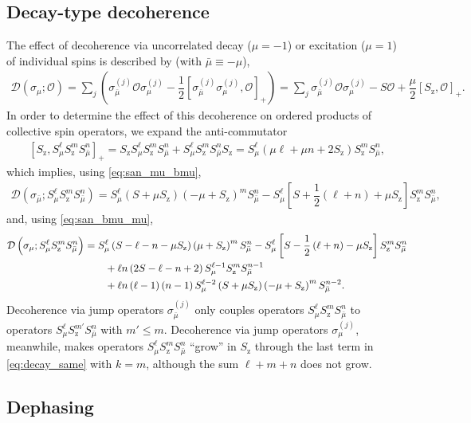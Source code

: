 \documentclass[aps,notitlepage,nofootinbib,11pt]{revtex4-1}
\newcommand{\f}[2]{\dfrac{#1}{#2}} %
\newcommand{\p}[1]{\left(#1\right)} %
\renewcommand{\sp}[1]{\left[#1\right]} %
\newcommand{\D}{\mathcal{D}}
\renewcommand{\O}{\mathcal{O}}
\newcommand{\z}{\text{z}}
\newcommand{\bmu}{{\bar\mu}}
\newcommand{\1}{\mathds{1}}
\begin{document}
\subsection{Decay-type decoherence}
\label{sec:decay_single}

The effect of decoherence via uncorrelated decay ($\mu=-1$) or
excitation ($\mu=1$) of individual spins is described by (with
$\bmu\equiv-\mu$),
\begin{align}
  \D\p{\sigma_\mu; \O}
  = \sum_j\p{\sigma_\bmu^{(j)} \O \sigma_\mu^{(j)}
    - \f12\sp{\sigma_\bmu^{(j)} \sigma_\mu^{(j)},\O}_+}
  = \sum_j \sigma_\bmu^{(j)} \O \sigma_\mu^{(j)}
    - S \O + \f{\mu}{2} \sp{S_\z, \O}_+.
\end{align}
In order to determine the effect of this decoherence on ordered
products of collective spin operators, we expand the anti-commutator
\begin{align}
  \sp{S_\z, S_\mu^\ell S_\z^m S_\bmu^n}_+
  = S_\z S_\mu^\ell S_\z^m S_\bmu^n + S_\mu^\ell S_\z^m S_\bmu^n S_\z
  = S_\mu^\ell\p{\mu\ell + \mu n + 2 S_\z} S_\z^m S_\bmu^n,
\end{align}
which implies, using \eqref{eq:san_mu_bmu},
\begin{align}
  \D\p{\sigma_\bmu; S_\mu^\ell S_\z^m S_\bmu^n}
  = S_\mu^\ell \p{S+\mu S_\z}\p{-\mu+S_\z}^m S_\bmu^n
  - S_\mu^\ell\sp{S + \f12\p{\ell+n} + \mu S_\z} S_\z^m S_\bmu^n,
  \label{eq:decay_diff}
\end{align}
and, using \eqref{eq:san_bmu_mu},
\begin{align}
  \D\p{\sigma_\mu; S_\mu^\ell S_\z^m S_\bmu^n}
  &= S_\mu^\ell \p{S - \ell - n - \mu S_\z} \p{\mu + S_\z}^m S_\bmu^n
  - S_\mu^\ell\sp{S - \f12\p{\ell+n} - \mu S_\z}
  S_\z^m S_\bmu^n \notag \\
  &\qquad + \ell n \p{2S - \ell - n + 2}
  S_\mu^{\ell-1} S_\z^m S_\bmu^{n-1} \notag \\
  &\qquad + \ell n \p{\ell-1} \p{n-1} S_\mu^{\ell-2} \p{S + \mu S_\z}
  \p{-\mu + S_\z}^m S_\bmu^{n-2}.
  \label{eq:decay_same}
\end{align}
Decoherence via jump operators $\sigma_\bmu^{(j)}$ only couples
operators $S_\mu^\ell S_\z^m S_\bmu^n$ to operators
$S_\mu^\ell S_\z^{m'} S_\bmu^n$ with $m'\le m$.  Decoherence via jump
operators $\sigma_\mu^{(j)}$, meanwhile, makes operators
$S_\mu^\ell S_\z^m S_\bmu^n$ ``grow'' in $S_\z$ through the last term
in \eqref{eq:decay_same} with $k=m$, although the sum $\ell+m+n$ does
not grow.


\subsection{Dephasing}
\label{sec:dephasing_single}
\end{document}
